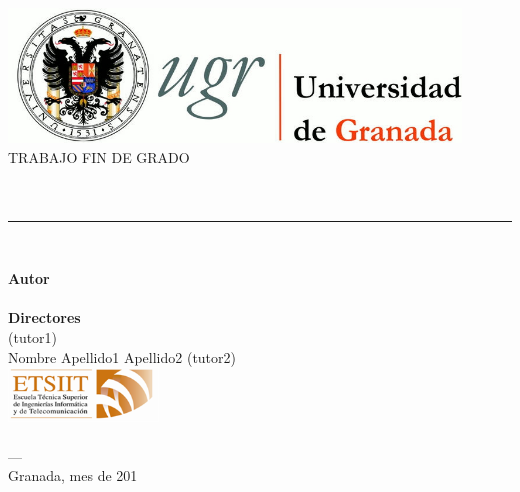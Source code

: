 \begin{titlepage}
 
 
\newlength{\centeroffset}
\setlength{\centeroffset}{-0.5\oddsidemargin}
\addtolength{\centeroffset}{0.5\evensidemargin}
\thispagestyle{empty}

\noindent\hspace*{\centeroffset}\begin{minipage}{\textwidth}

\centering
\includegraphics[width=0.9\textwidth]{imagenes/logo_ugr.jpg}\\[1.4cm]

\textsc{ \Large TRABAJO FIN DE GRADO\\[0.2cm]}
\textsc{ \myDegree}\\[1cm]
% 
{\Huge\bfseries \myTitle\\
}
\noindent\rule[-1ex]{\textwidth}{3pt}\\[3.5ex]
{\large\bfseries \mySubTitle}
\end{minipage}

\vspace{2.5cm}
\noindent\hspace*{\centeroffset}\begin{minipage}{\textwidth}
\centering

\textbf{Autor}\\ {\myName} \\[2.5ex]
\textbf{Directores}\\
{\myProf (tutor1)\\
Nombre Apellido1 Apellido2 (tutor2)}\\[2cm]
\includegraphics[width=0.3\textwidth]{imagenes/etsiit_logo.png}\\[0.1cm]
\textsc{\myFaculty}\\
\textsc{---}\\
Granada, mes de 201
\end{minipage}
\end{titlepage}


